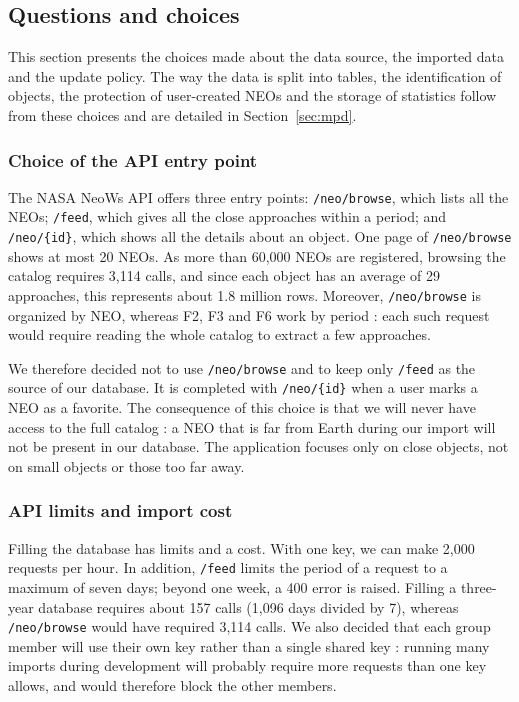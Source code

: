 \subsection{Questions and choices}

This section presents the choices made about the data source, the imported
data and the update policy. The way the data is split into tables, the
identification of objects, the protection of user-created NEOs and the
storage of statistics follow from these choices and are detailed in
Section~\ref{sec:mpd}.

\subsubsection{Choice of the API entry point}

The NASA NeoWs API offers three entry points: \texttt{/neo/browse}, which
lists all the NEOs; \texttt{/feed}, which gives all the close approaches
within a period; and \texttt{/neo/\{id\}}, which shows all the details about
an object. One page of \texttt{/neo/browse} shows at most 20 NEOs. As more
than 60,000 NEOs are registered, browsing the catalog requires 3,114 calls,
and since each object has an average of 29 approaches, this represents about
1.8 million rows. Moreover, \texttt{/neo/browse} is organized by NEO, whereas
F2, F3 and F6 work by period  : each such request would require reading the
whole catalog to extract a few approaches.

We therefore decided not to use \texttt{/neo/browse} and to keep only
\texttt{/feed} as the source of our database. It is completed with
\texttt{/neo/\{id\}} when a user marks a NEO as a favorite. The consequence
of this choice is that we will never have access to the full catalog : a NEO
that is far from Earth during our import will not be present in our
database. The application focuses only on close objects, not on small
objects or those too far away.

\subsubsection{API limits and import cost}

Filling the database has limits and a cost. With one key, we can make 2,000
requests per hour. In addition, \texttt{/feed} limits the period of a
request to a maximum of seven days; beyond one week, a 400 error is raised.
Filling a three-year database requires about 157 calls (1,096 days divided
by 7), whereas \texttt{/neo/browse} would have required 3,114 calls. We also
decided that each group member will use their own key rather than a single
shared key : running many imports during development will probably require
more requests than one key allows, and would therefore block the other
members.

